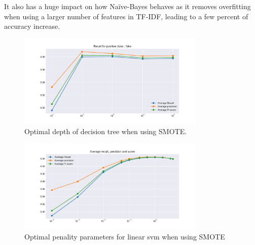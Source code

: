 It also has a huge impact on how Naïve-Bayes behaves as it removes overfitting when using a larger number of features in TF-IDF, leading to a few percent of accuracy increase. \\
\begin{figure}
	\centering
	\includegraphics[width=0.8\textwidth]{images/chapitre3/fake-dt-SMOTE}
	\caption{Optimal depth of decision tree when using SMOTE.}
	\label{fig:chap3:dt3}
\end{figure}
\begin{figure}
	\centering
	\includegraphics[width=0.8\textwidth]{images/chapitre3/svc_fake_smote}
	\caption{Optimal penality parameters for linear svm when using SMOTE}
	\label{fig:chap3:lsvm3}
\end{figure}


